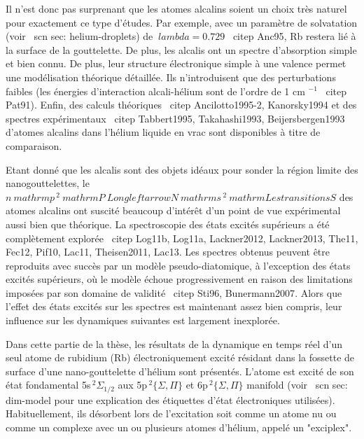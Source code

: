 		Il n'est donc pas surprenant que les atomes alcalins soient un choix très naturel pour exactement ce type d'études. Par exemple, avec un paramètre de solvatation (voir \ scn {sec: helium-droplets}) de $ \ lambda = 0.729 $ \ citep {Anc95}, Rb restera lié à la surface de la gouttelette. De plus, les alcalis ont un spectre d'absorption simple et bien connu. De plus, leur structure électronique simple à une valence permet une modélisation théorique détaillée. Ils n'introduisent que des perturbations faibles (les énergies d'interaction alcali-hélium sont de l'ordre de 1 cm $ ^ {- 1} $ \ citep {Pat91}). Enfin, des calculs théoriques \ citep {Ancilotto1995-2, Kanorsky1994} et des spectres expérimentaux \ citep {Tabbert1995, Takahashi1993, Beijersbergen1993} d'atomes alcalins dans l'hélium liquide en vrac sont disponibles à titre de comparaison.
		
		Etant donné que les alcalis sont des objets idéaux pour sonder la région limite des nanogouttelettes, le $ n \ mathrm {p} \, ^ 2 \ mathrm {P} \! \ Longleftarrow \! N \ mathrm {s} \, ^ 2 \ mathrm Les transitions {S} $ des atomes alcalins ont suscité beaucoup d'intérêt d'un point de vue expérimental aussi bien que théorique. La spectroscopie des états excités supérieurs a été complètement explorée \ citep {Log11b, Log11a, Lackner2012, Lackner2013, The11, Fec12, Pif10, Lac11, Theisen2011, Lac13}. Les spectres obtenus peuvent être reproduits avec succès par un modèle pseudo-diatomique, à l'exception des états excités supérieurs, où le modèle échoue progressivement en raison des limitations imposées par son domaine de validité \ citep {Sti96, Bunermann2007}. Alors que l'effet des états excités sur les spectres est maintenant assez bien compris, leur influence sur les dynamiques suivantes est largement inexplorée.
		
		Dans cette partie de la thèse, les résultats de la dynamique en temps réel d'un seul atome de rubidium (Rb) électroniquement excité résidant dans la fossette de surface d'une nano-gouttelette d'hélium sont présentés. L'atome est excité de son état fondamental 5s$\,^2\Sigma_{1/2}$ aux 5p$\,^2\{\Sigma,\Pi\}$ et 6p$\,^2\{\Sigma,\Pi\}$ manifold (voir \ scn {sec: dim-model} pour une explication des étiquettes d'état électroniques utilisées). Habituellement, ils désorbent lors de l'excitation soit comme un atome nu ou comme un complexe avec un ou plusieurs atomes d'hélium, appelé un "exciplex".	
	
